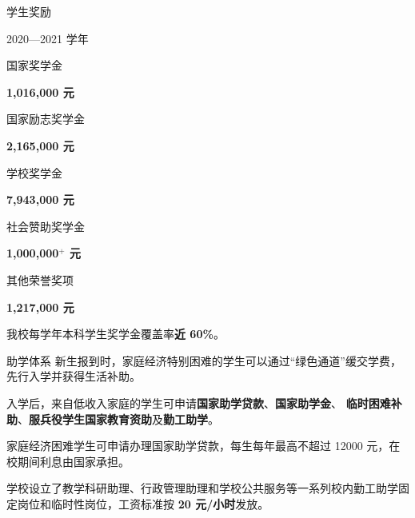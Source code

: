 \documentclass[aspectratio=169, utf8, fontset=windows]{beamer}
\begin{document}
\begin{frame}{学生奖励}
    \begin{block}{2020—2021 学年}
        \begin{multicols}{3}
            \begin{center}
                国家奖学金

                \textcolor{Fore}{\textbf{\Large{1,016,000 元}}}\\[1em]
            \end{center}

            \begin{center}
                国家励志奖学金

                \textcolor{Fore}{\textbf{\Large{2,165,000 元}}}\\[1em]
            \end{center}

            \begin{center}
                学校奖学金

                \textcolor{Fore}{\textbf{\Large{7,943,000 元}}}\\[1em]
            \end{center}

            \begin{center}
                社会赞助奖学金

                \textcolor{Fore}{\textbf{\Large{1,000,000$^+$ 元}}}\\[1em]
            \end{center}

            \begin{center}
                其他荣誉奖项

                \textcolor{Fore}{\textbf{\Large{1,217,000 元}}}\\[1em]
            \end{center}
        \end{multicols}
    \end{block}

    我校每学年本科学生奖学金覆盖率\textcolor{Fore}{\textbf{近 60\%}}。
\end{frame}

\begin{frame}{助学体系}
    新生报到时，家庭经济特别困难的学生可以通过“绿色通道”缓交学费，先行入学并获得生活补助。

    入学后，来自低收入家庭的学生可申请\textcolor{Fore}{\textbf{国家助学贷款}}、\textcolor{Fore}{\textbf{国家助学金}}、
    \textcolor{Fore}{\textbf{临时困难补助}}、\textcolor{Fore}{\textbf{服兵役学生国家教育资助}}及\textcolor{Fore}{\textbf{勤工助学}}。

    家庭经济困难学生可申请办理国家助学贷款，每生每年最高不超过 12000 元，在校期间利息由国家承担。

    学校设立了教学科研助理、行政管理助理和学校公共服务等一系列校内勤工助学固定岗位和临时性岗位，工资标准按 \textcolor{Fore}{\textbf{20 元/小时}}发放。
\end{frame}
\end{document}
